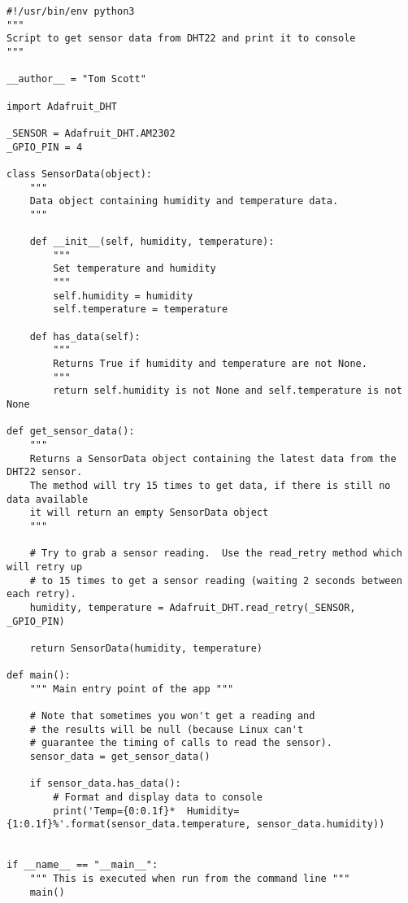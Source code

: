 \begin{verbatim}
#!/usr/bin/env python3
"""
Script to get sensor data from DHT22 and print it to console
"""

__author__ = "Tom Scott"

import Adafruit_DHT

_SENSOR = Adafruit_DHT.AM2302
_GPIO_PIN = 4

class SensorData(object):
    """
    Data object containing humidity and temperature data.
    """

    def __init__(self, humidity, temperature):
        """
        Set temperature and humidity
        """
        self.humidity = humidity
        self.temperature = temperature

    def has_data(self):
        """
        Returns True if humidity and temperature are not None.
        """
        return self.humidity is not None and self.temperature is not None

def get_sensor_data():
    """
    Returns a SensorData object containing the latest data from the DHT22 sensor.
    The method will try 15 times to get data, if there is still no data available
    it will return an empty SensorData object
    """

    # Try to grab a sensor reading.  Use the read_retry method which will retry up
    # to 15 times to get a sensor reading (waiting 2 seconds between each retry).
    humidity, temperature = Adafruit_DHT.read_retry(_SENSOR, _GPIO_PIN)

    return SensorData(humidity, temperature)

def main():
    """ Main entry point of the app """

    # Note that sometimes you won't get a reading and
    # the results will be null (because Linux can't
    # guarantee the timing of calls to read the sensor).
    sensor_data = get_sensor_data()

    if sensor_data.has_data():
        # Format and display data to console
        print('Temp={0:0.1f}*  Humidity={1:0.1f}%'.format(sensor_data.temperature, sensor_data.humidity))


if __name__ == "__main__":
    """ This is executed when run from the command line """
    main()
\end{verbatim}